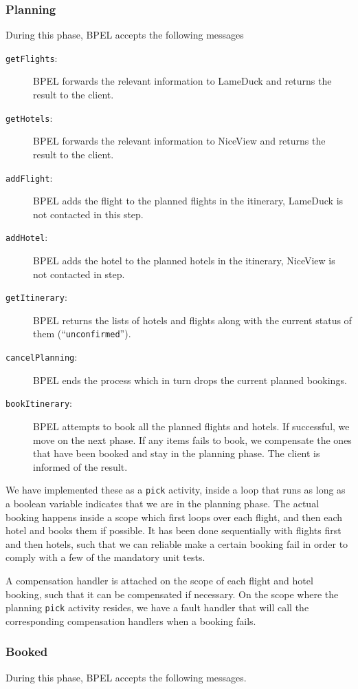 \subsubsection{Planning}
During this phase, BPEL accepts the following messages

\begin{description}
\item [\texttt{getFlights}:] BPEL forwards the relevant information to LameDuck and returns the result to the client.
\item [\texttt{getHotels}:] BPEL forwards the relevant information to NiceView and returns the result to the client.
\item [\texttt{addFlight}:] BPEL adds the flight to the planned flights in the itinerary, LameDuck is not contacted in this step.
\item [\texttt{addHotel}:] BPEL adds the hotel to the planned hotels in the itinerary, NiceView is not contacted in step.
\item [\texttt{getItinerary}:] BPEL returns the lists of hotels and flights along with the current status of them (``\texttt{unconfirmed}'').
\item [\texttt{cancelPlanning}:] BPEL ends the process which in turn drops the current planned bookings.
\item [\texttt{bookItinerary}:] BPEL attempts to book all the planned flights and hotels. If successful, we move on the next phase. If any items fails to book, we compensate the ones that have been booked and stay in the planning phase. The client is informed of the result.
\end{description}

We have implemented these as a \texttt{pick} activity, inside a loop that runs as long as a boolean variable indicates that we are in the planning phase. The actual booking happens inside a scope which first loops over each flight, and then each hotel and books them if possible. It has been done sequentially with flights first and then hotels, such that we can reliable make a certain booking fail in order to comply with a few of the mandatory unit tests. 

A compensation handler is attached on the scope of each flight and hotel booking, such that it can be compensated if necessary. On the scope where the planning \texttt{pick} activity resides, we have a fault handler that will call the corresponding compensation handlers when a booking fails.

\subsubsection{Booked}
During this phase, BPEL accepts the following messages.

